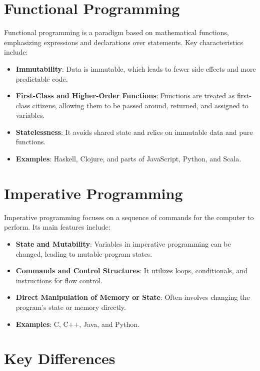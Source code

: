
\section*{Functional Programming}

Functional programming is a paradigm based on mathematical functions, emphasizing expressions and declarations over statements. Key characteristics include:

\begin{itemize}
	\item \textbf{Immutability}: Data is immutable, which leads to fewer side effects and more predictable code.
	\item \textbf{First-Class and Higher-Order Functions}: Functions are treated as first-class citizens, allowing them to be passed around, returned, and assigned to variables.
	\item \textbf{Statelessness}: It avoids shared state and relies on immutable data and pure functions.
	\item \textbf{Examples}: Haskell, Clojure, and parts of JavaScript, Python, and Scala.
\end{itemize}

\section*{Imperative Programming}

Imperative programming focuses on a sequence of commands for the computer to perform. Its main features include:

\begin{itemize}
	\item \textbf{State and Mutability}: Variables in imperative programming can be changed, leading to mutable program states.
	\item \textbf{Commands and Control Structures}: It utilizes loops, conditionals, and instructions for flow control.
	\item \textbf{Direct Manipulation of Memory or State}: Often involves changing the program’s state or memory directly.
	\item \textbf{Examples}: C, C++, Java, and Python.
\end{itemize}

\section*{Key Differences}

